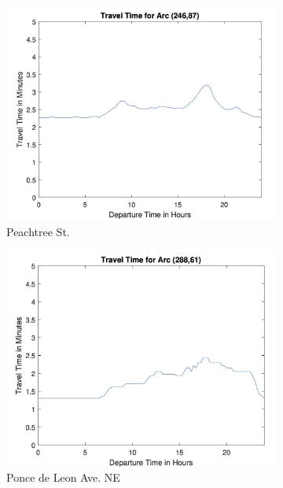 \documentclass[../main.tex]{subfiles}
\begin{document}
\begin{figure}
    \begin{subfigure}{0.5\textwidth}
        \centering
        \includegraphics{edited-images/Figure15a.jpg}
        \caption{Peachtree St.}
        \label{fig:15a}
    \end{subfigure}
    \begin{subfigure}{0.5\textwidth}
        \centering
        \includegraphics{edited-images/Figure15b.jpg}
        \caption{Ponce de Leon Ave. NE}
        \label{fig:15b}
    \end{subfigure}
    \begin{subfigure}{0.5\textwidth}

\end{subfigure}
\end{figure}
\end{document}
